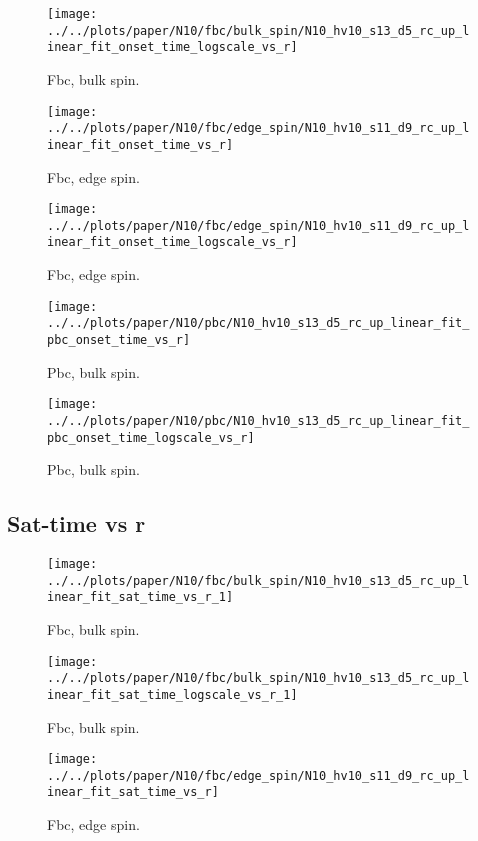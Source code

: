 \documentclass[a4paper]{article}
\begin{document}
\begin{figure}[h]
  \centering
  \texttt{[image: ../../plots/paper/N10/fbc/bulk\_spin/N10\_hv10\_s13\_d5\_rc\_up\_linear\_fit\_onset\_time\_logscale\_vs\_r]}
  \caption{Fbc, bulk spin.}
\end{figure}

\begin{figure}[h]
  \centering
  \texttt{[image: ../../plots/paper/N10/fbc/edge\_spin/N10\_hv10\_s11\_d9\_rc\_up\_linear\_fit\_onset\_time\_vs\_r]}
  \caption{Fbc, edge spin.}
\end{figure}

\begin{figure}[h]
  \centering
  \texttt{[image: ../../plots/paper/N10/fbc/edge\_spin/N10\_hv10\_s11\_d9\_rc\_up\_linear\_fit\_onset\_time\_logscale\_vs\_r]}
  \caption{Fbc, edge spin.}
\end{figure}

\clearpage
\begin{figure}[h]
  \centering
  \texttt{[image: ../../plots/paper/N10/pbc/N10\_hv10\_s13\_d5\_rc\_up\_linear\_fit\_pbc\_onset\_time\_vs\_r]}
  \caption{Pbc, bulk spin.}
\end{figure}

\begin{figure}[h]
  \centering
  \texttt{[image: ../../plots/paper/N10/pbc/N10\_hv10\_s13\_d5\_rc\_up\_linear\_fit\_pbc\_onset\_time\_logscale\_vs\_r]}
  \caption{Pbc, bulk spin.}
\end{figure}

\clearpage
\subsection{Sat-time vs r}
\begin{figure}[h]
  \centering
  \texttt{[image: ../../plots/paper/N10/fbc/bulk\_spin/N10\_hv10\_s13\_d5\_rc\_up\_linear\_fit\_sat\_time\_vs\_r\_1]}
  \caption{Fbc, bulk spin.}
\end{figure}

\begin{figure}[h]
  \centering
  \texttt{[image: ../../plots/paper/N10/fbc/bulk\_spin/N10\_hv10\_s13\_d5\_rc\_up\_linear\_fit\_sat\_time\_logscale\_vs\_r\_1]}
  \caption{Fbc, bulk spin.}
\end{figure}

\begin{figure}[h]
  \centering
  \texttt{[image: ../../plots/paper/N10/fbc/edge\_spin/N10\_hv10\_s11\_d9\_rc\_up\_linear\_fit\_sat\_time\_vs\_r]}
  \caption{Fbc, edge spin.}
\end{figure}
\end{document}
